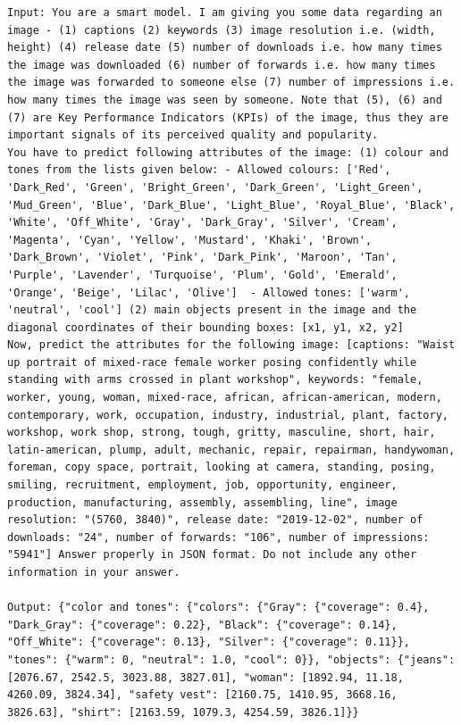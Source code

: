 \begin{lstlisting}[caption={Engagement Finetuning Verbalization Pattern (1): Explicitly asking model to pay attention to engagement tokens},frame=single,label={EngageNet:verbalization-1},basicstyle=\scriptsize]
Input: You are a smart model. I am giving you some data regarding an image - (1) captions (2) keywords (3) image resolution i.e. (width, height) (4) release date (5) number of downloads i.e. how many times the image was downloaded (6) number of forwards i.e. how many times the image was forwarded to someone else (7) number of impressions i.e. how many times the image was seen by someone. Note that (5), (6) and (7) are Key Performance Indicators (KPIs) of the image, thus they are important signals of its perceived quality and popularity.
You have to predict following attributes of the image: (1) colour and tones from the lists given below: - Allowed colours: ['Red', 'Dark_Red', 'Green', 'Bright_Green', 'Dark_Green', 'Light_Green', 'Mud_Green', 'Blue', 'Dark_Blue', 'Light_Blue', 'Royal_Blue', 'Black', 'White', 'Off_White', 'Gray', 'Dark_Gray', 'Silver', 'Cream', 'Magenta', 'Cyan', 'Yellow', 'Mustard', 'Khaki', 'Brown', 'Dark_Brown', 'Violet', 'Pink', 'Dark_Pink', 'Maroon', 'Tan', 'Purple', 'Lavender', 'Turquoise', 'Plum', 'Gold', 'Emerald', 'Orange', 'Beige', 'Lilac', 'Olive']  - Allowed tones: ['warm', 'neutral', 'cool'] (2) main objects present in the image and the diagonal coordinates of their bounding boxes: [x1, y1, x2, y2]
Now, predict the attributes for the following image: [captions: "Waist up portrait of mixed-race female worker posing confidently while standing with arms crossed in plant workshop", keywords: "female, worker, young, woman, mixed-race, african, african-american, modern, contemporary, work, occupation, industry, industrial, plant, factory, workshop, work shop, strong, tough, gritty, masculine, short, hair, latin-american, plump, adult, mechanic, repair, repairman, handywoman, foreman, copy space, portrait, looking at camera, standing, posing, smiling, recruitment, employment, job, opportunity, engineer, production, manufacturing, assembly, assembling, line", image resolution: "(5760, 3840)", release date: "2019-12-02", number of downloads: "24", number of forwards: "106", number of impressions: "5941"] Answer properly in JSON format. Do not include any other information in your answer.

Output: {"color and tones": {"colors": {"Gray": {"coverage": 0.4}, "Dark_Gray": {"coverage": 0.22}, "Black": {"coverage": 0.14}, "Off_White": {"coverage": 0.13}, "Silver": {"coverage": 0.11}}, "tones": {"warm": 0, "neutral": 1.0, "cool": 0}}, "objects": {"jeans": [2076.67, 2542.5, 3023.88, 3827.01], "woman": [1892.94, 11.18, 4260.09, 3824.34], "safety vest": [2160.75, 1410.95, 3668.16, 3826.63], "shirt": [2163.59, 1079.3, 4254.59, 3826.1]}}
\end{lstlisting}


